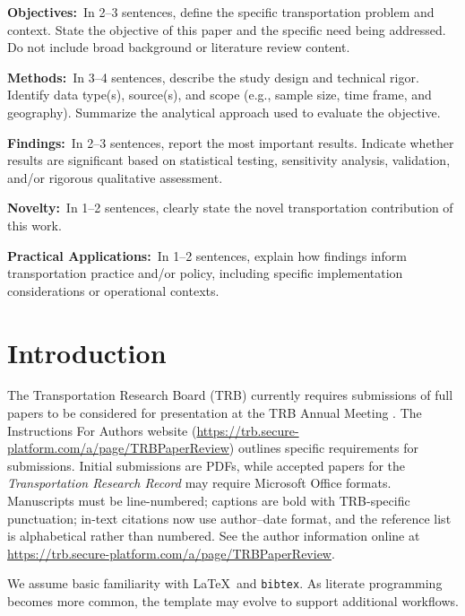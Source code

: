 \documentclass[numbered]{trbunofficial}
\begin{document}
\hfill\break%
\noindent\textbf{Objectives:}~In 2--3 sentences, define the specific transportation problem and context. State the objective of this paper and the specific need being addressed. Do not include broad background or literature review content.

\hfill\break%
\noindent\textbf{Methods:}~In 3--4 sentences, describe the study design and technical rigor. Identify data type(s), source(s), and scope (e.g., sample size, time frame, and geography). Summarize the analytical approach used to evaluate the objective.

\hfill\break%
\noindent\textbf{Findings:}~In 2--3 sentences, report the most important results. Indicate whether results are significant based on statistical testing, sensitivity analysis, validation, and/or rigorous qualitative assessment.

\hfill\break%
\noindent\textbf{Novelty:}~In 1--2 sentences, clearly state the novel transportation contribution of this work.

\hfill\break%
\noindent\textbf{Practical Applications:}~In 1--2 sentences, explain how findings inform transportation practice and/or policy, including specific implementation considerations or operational contexts.

\newpage

\section{Introduction}\label{sec:intro}
The Transportation Research Board (TRB) currently requires submissions of full papers to be considered for presentation at the TRB Annual Meeting \cite{trbwebsite}.  The Instructions For Authors website (\url{https://trb.secure-platform.com/a/page/TRBPaperReview}) outlines specific requirements for submissions. Initial submissions are PDFs, while accepted papers for the \textit{Transportation Research Record} may require Microsoft Office formats. Manuscripts must be line-numbered; captions are bold with TRB-specific punctuation; in-text citations now use author--date format, and the reference list is alphabetical rather than numbered. See the author information online at \url{https://trb.secure-platform.com/a/page/TRBPaperReview}.

We assume basic familiarity with \LaTeX\ and \verb|bibtex|. As literate programming becomes more common, the template may evolve to support additional workflows.
\end{document}
